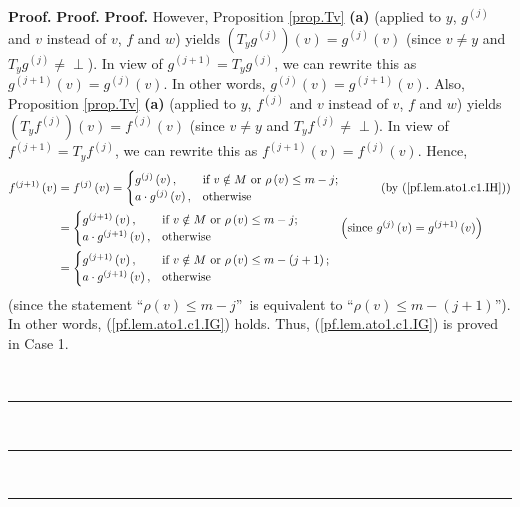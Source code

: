 \documentclass[numbers=enddot,12pt,final,onecolumn,notitlepage]{scrartcl}%
\theoremstyle{definition}
\newenvironment{verlong}{}{}
\newcommand{\undf}{\operatorname*{\bot}}
\newenvironment{proof}[1][Proof]{\noindent\textbf{#1.} }{\ \rule{0.5em}{0.5em}}
\begin{document}
\begin{verlong}
\begin{proof}
\begin{proof}
\begin{proof}
However, Proposition \ref{prop.Tv} \textbf{(a)} (applied to $y$, $g^{\left(
j\right)  }$ and $v$ instead of $v$, $f$ and $w$) yields $\left(
T_{y}g^{\left(  j\right)  }\right)  \left(  v\right)  =g^{\left(  j\right)
}\left(  v\right)  $ (since $v\neq y$ and $T_{y}g^{\left(  j\right)  }%
\neq\undf$). In view of $g^{\left(  j+1\right)  }=T_{y}g^{\left(  j\right)  }%
$, we can rewrite this as $g^{\left(  j+1\right)  }\left(  v\right)
=g^{\left(  j\right)  }\left(  v\right)  $. In other words, $g^{\left(
j\right)  }\left(  v\right)  =g^{\left(  j+1\right)  }\left(  v\right)  $.
Also, Proposition \ref{prop.Tv} \textbf{(a)} (applied to $y$, $f^{\left(
j\right)  }$ and $v$ instead of $v$, $f$ and $w$) yields $\left(
T_{y}f^{\left(  j\right)  }\right)  \left(  v\right)  =f^{\left(  j\right)
}\left(  v\right)  $ (since $v\neq y$ and $T_{y}f^{\left(  j\right)  }%
\neq\undf$). In view of $f^{\left(  j+1\right)  }=T_{y}f^{\left(  j\right)  }%
$, we can rewrite this as $f^{\left(  j+1\right)  }\left(  v\right)
=f^{\left(  j\right)  }\left(  v\right)  $. Hence,%
\begin{align*}
f^{\left(  j+1\right)  }\left(  v\right)   &  =f^{\left(  j\right)  }\left(
v\right)  =%
\begin{cases}
g^{\left(  j\right)  }\left(  v\right)  , & \text{if }v\notin M\text{ or }%
\rho\left(  v\right)  \leq m-j;\\
a\cdot g^{\left(  j\right)  }\left(  v\right)  , & \text{otherwise}%
\end{cases}
\ \ \ \ \ \ \ \ \ \ \left(  \text{by (\ref{pf.lem.ato1.c1.IH})}\right) \\
&  =%
\begin{cases}
g^{\left(  j+1\right)  }\left(  v\right)  , & \text{if }v\notin M\text{ or
}\rho\left(  v\right)  \leq m-j;\\
a\cdot g^{\left(  j+1\right)  }\left(  v\right)  , & \text{otherwise}%
\end{cases}
\ \ \ \ \ \ \ \ \ \ \left(  \text{since }g^{\left(  j\right)  }\left(
v\right)  =g^{\left(  j+1\right)  }\left(  v\right)  \right) \\
&  =%
\begin{cases}
g^{\left(  j+1\right)  }\left(  v\right)  , & \text{if }v\notin M\text{ or
}\rho\left(  v\right)  \leq m-\left(  j+1\right)  ;\\
a\cdot g^{\left(  j+1\right)  }\left(  v\right)  , & \text{otherwise}%
\end{cases}
\end{align*}
(since the statement \textquotedblleft$\rho\left(  v\right)  \leq
m-j$\textquotedblright\ is equivalent to \textquotedblleft$\rho\left(
v\right)  \leq m-\left(  j+1\right)  $\textquotedblright). In other words,
(\ref{pf.lem.ato1.c1.IG}) holds. Thus, (\ref{pf.lem.ato1.c1.IG}) is proved in
Case 1.


\end{proof}
\end{proof}
\end{proof}
\end{verlong}
\end{document}
